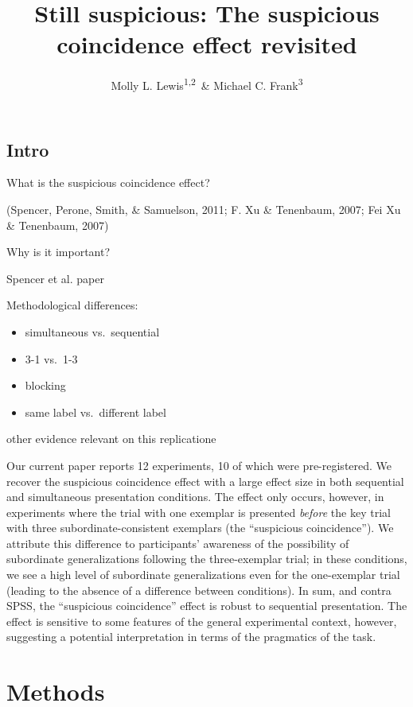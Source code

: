\documentclass[english,floatsintext,man]{apa6}
\title{Still suspicious: The suspicious coincidence effect revisited}
\author{Molly L. Lewis\textsuperscript{1,2}~\& Michael C. Frank\textsuperscript{3}}
\affiliation{
    \vspace{0.5cm}
          \textsuperscript{1} Computation Institute, University of Chicago\\
          \textsuperscript{2} Department of Psychology, University of Wisconsin, Madison\\
          \textsuperscript{3} Department of Psychology, Stanford University  }
\providecommand{\tightlist}{%
  \setlength{\itemsep}{0pt}\setlength{\parskip}{0pt}}
\theoremstyle{definition}
\theoremstyle{definition}
\theoremstyle{remark}
\begin{document}
\maketitle

\setcounter{secnumdepth}{0}



\subsection{Intro}\label{intro}

What is the suspicious coincidence effect?

(Spencer, Perone, Smith, \& Samuelson, 2011; F. Xu \& Tenenbaum, 2007;
Fei Xu \& Tenenbaum, 2007)

Why is it important?

Spencer et al. paper

Methodological differences:

\begin{itemize}
\tightlist
\item
  simultaneous vs.~sequential
\item
  3-1 vs.~1-3
\item
  blocking
\item
  same label vs.~different label
\end{itemize}

other evidence relevant on this replicatione

Our current paper reports 12 experiments, 10 of which were
pre-registered. We recover the suspicious coincidence effect with a
large effect size in both sequential and simultaneous presentation
conditions. The effect only occurs, however, in experiments where the
trial with one exemplar is presented \emph{before} the key trial with
three subordinate-consistent exemplars (the \enquote{suspicious
coincidence}). We attribute this difference to participants' awareness
of the possibility of subordinate generalizations following the
three-exemplar trial; in these conditions, we see a high level of
subordinate generalizations even for the one-exemplar trial (leading to
the absence of a difference between conditions). In sum, and contra
SPSS, the \enquote{suspicious coincidence} effect is robust to
sequential presentation. The effect is sensitive to some features of the
general experimental context, however, suggesting a potential
interpretation in terms of the pragmatics of the task.

\section{Methods}\label{methods}
\end{document}
